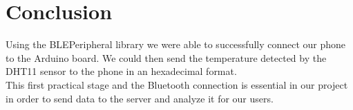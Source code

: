 \section{Conclusion}
Using the BLEPeripheral library we were able to successfully connect our phone to the Arduino board. We could then send the temperature detected by the DHT11 sensor to the phone in an hexadecimal format.\\
This first practical stage and the Bluetooth connection is essential in our project in order to send data to the server and analyze it for our users.
